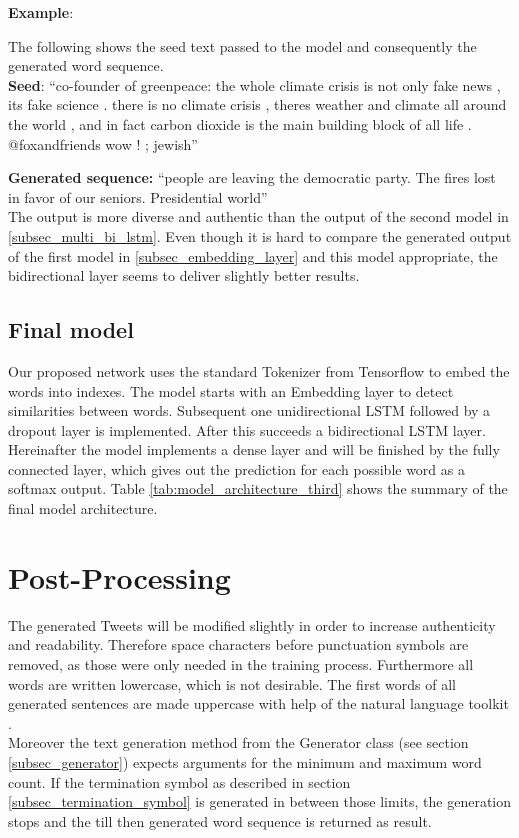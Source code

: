 \documentclass[hidelinks, conference]{IEEEtran}
\begin{document}
\textbf{Example}:

The following shows the seed text passed to the model and consequently the generated word sequence.\\

\textbf{Seed}: ``co-founder of greenpeace: the whole climate crisis is not only fake news , its fake science . there is no climate crisis , theres weather and climate all around the world , and in fact carbon dioxide is the main building block of all life . @foxandfriends wow ! ; jewish''

\textbf{Generated sequence:} ``people are leaving the democratic party. The fires lost in favor of our seniors. Presidential world''\\

The output is more diverse and authentic than the output of the second model in \ref{subsec_multi_bi_lstm}. Even though it is hard to compare the generated output of the first model in \ref{subsec_embedding_layer} and this model appropriate, the bidirectional layer seems to deliver slightly better results.

\subsection{Final model}

Our proposed network uses the standard Tokenizer from Tensorflow to embed the words into indexes. The model starts with an Embedding layer to detect similarities between words. Subsequent one unidirectional LSTM followed by a dropout layer is implemented. After this succeeds a bidirectional LSTM layer. Hereinafter the model implements a dense layer and will be finished by the fully connected layer, which gives out the prediction for each possible word as a softmax output. Table \ref{tab:model_architecture_third} shows the summary of the final model architecture.

\section{Post-Processing}

The generated Tweets will be modified slightly in order to increase authenticity and readability. Therefore space characters before punctuation symbols are removed, as those were only needed in the training process. Furthermore all words are written lowercase, which is not desirable. The first words of all generated sentences are made uppercase with help of the natural language toolkit \cite{nltk}.\\
Moreover the text generation method from the Generator class (see section \ref{subsec_generator}) expects arguments for the minimum and maximum word count. If the termination symbol as described in section \ref{subsec_termination_symbol} is generated in between those limits, the generation stops and the till then generated word sequence is returned as result.
\end{document}
